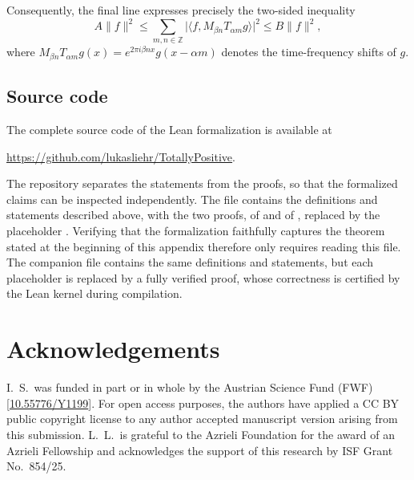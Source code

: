 \documentclass[reqno,a4paper,12pt]{amsart}
\numberwithin{equation}{section}
\newcommand\1{\mathds{1}}
\begin{document}
Consequently, the final line expresses precisely the two-sided inequality
$$
  A\| f\|^2
  \leq \sum_{m,n\in\mathbb Z}
       \bigl|\langle f,M_{\beta n}T_{\alpha m}g\rangle\bigr|^2
  \leq B\| f\|^2,
$$
where $M_{\beta n}T_{\alpha m}g(x) = e^{2\pi i \beta n x}g(x-\alpha m)$ denotes the time-frequency shifts of $g$.

\subsection{Source code}

The complete source code of the Lean formalization is available at
\begin{center}
\url{https://github.com/lukasliehr/TotallyPositive}.
\end{center}
The repository separates the statements from the proofs, so that the formalized claims can be inspected independently. The file  contains the definitions and statements described above, with the two proofs, of  and of , replaced by the placeholder . Verifying that the formalization faithfully captures the theorem stated at the beginning of this appendix therefore only requires reading this file. The companion file  contains the same definitions and statements, but each placeholder is replaced by a fully verified proof, whose correctness is certified by the Lean kernel during compilation.


\section{Acknowledgements}
I.~S.~was funded in part or in whole by the Austrian Science Fund (FWF)  [\href{https://doi.org/10.55776/Y1199}{10.55776/Y1199}]. For open access purposes, the authors have applied a CC BY public
copyright license to any author accepted manuscript version arising from this submission.
L.~L.~is grateful to the Azrieli Foundation for the award of an Azrieli Fellowship and acknowledges the support of this research by ISF Grant No.~854/25.




\end{document}
